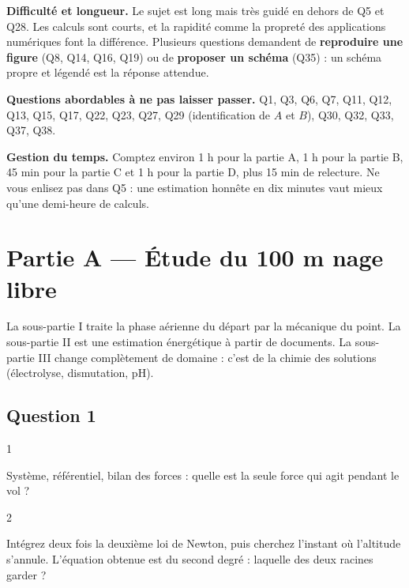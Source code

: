 \documentclass[11pt,a4paper]{article}
\begin{document}
\textbf{Difficulté et longueur.} Le sujet est long mais très guidé en dehors de Q5 et Q28. Les calculs sont courts, et la rapidité comme la propreté des applications numériques font la différence. Plusieurs questions demandent de \textbf{reproduire une figure} (Q8, Q14, Q16, Q19) ou de \textbf{proposer un schéma} (Q35) : un schéma propre et légendé est la réponse attendue.

\textbf{Questions abordables à ne pas laisser passer.} Q1, Q3, Q6, Q7, Q11, Q12, Q13, Q15, Q17, Q22, Q23, Q27, Q29 (identification de \(A\) et \(B\)), Q30, Q32, Q33, Q37, Q38.

\textbf{Gestion du temps.} Comptez environ 1 h pour la partie A, 1 h pour la partie B, 45 min pour la partie C et 1 h pour la partie D, plus 15 min de relecture. Ne vous enlisez pas dans Q5 : une estimation honnête en dix minutes vaut mieux qu'une demi-heure de calculs.

\hypertarget{partie-a-uxe9tude-du-100-m-nage-libre}{%
\section{Partie A --- Étude du 100 m nage libre}\label{partie-a-uxe9tude-du-100-m-nage-libre}}

La sous-partie I traite la phase aérienne du départ par la mécanique du point. La sous-partie II est une estimation énergétique à partir de documents. La sous-partie III change complètement de domaine : c'est de la chimie des solutions (électrolyse, dismutation, pH).

\hypertarget{question-1}{%
\subsection{Question 1}\label{question-1}}

\begin{indication}{1}

Système, référentiel, bilan des forces : quelle est la seule force qui agit pendant le vol ?

\end{indication}

\begin{indication}{2}

Intégrez deux fois la deuxième loi de Newton, puis cherchez l'instant où l'altitude s'annule. L'équation obtenue est du second degré : laquelle des deux racines garder ?

\end{indication}
\end{document}
